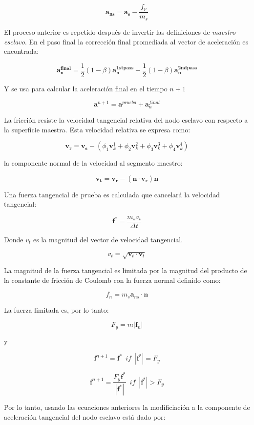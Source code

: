 $$
\mathbf{a_{ns}} = \mathbf{a_s} - \frac{f_p}{m_s}
$$

El proceso anterior es repetido después de invertir las definiciones de \textit{maestro-esclavo}. 
En el paso final la corrección final promediada al vector de aceleración es encontrada:

$$
\mathbf{a_n^{final}} = \frac{1}{2} (1-\beta) \mathbf{a_n^{1st pass}} + 
\frac{1}{2} (1-\beta) \mathbf{a_n^{2nd pass}} 
$$

Y se usa para calcular la aceleración final en el tiempo $n+1$

$$
\mathbf{a}^{n+1} = \mathbf{a}^{prueba} + \mathbf{a}_n^{final}
$$

La fricción resiste la velocidad tangencial relativa del nodo esclavo con respecto a 
la superficie maestra. Esta velocidad relativa se expresa como:

$$
\mathbf{v_r} = \mathbf{v_s} - 
\left(
\phi_1 \mathbf{v}_k^1 + \phi_2 \mathbf{v}_k^2 + \phi_3 \mathbf{v}_k^3 + \phi_4 \mathbf{v}_k^4
\right)
$$

la componente normal de la velocidad al segmento maestro:

$$
\mathbf{v_t} = \mathbf{v_r} - (\mathbf{n} \cdot \mathbf{v_r}) \mathbf{n}
$$

Una fuerza tangencial de prueba es calculada que cancelará la velocidad tangencial:

$$
\mathbf{f^{\ast}} = \frac{m_s v_t}{\Delta t}
$$

Donde $v_t$ es la magnitud del vector de velocidad tangencial.

$$
v_t = \sqrt{\mathbf{v}_t \cdot \mathbf{v}_t}
$$

La magnitud de la fuerza tangencial es limitada por la magnitud del producto de la constante de fricción 
de Coulomb con la fuerza normal definido como:

$$
f_n = m_s \mathbf{a}_{ns} \cdot \mathbf{n}
$$

La fuerza limitada es, por lo tanto:

$$
F_y = m |\mathbf{f}_n|
$$

y 

$$
\mathbf{f}^{n+1} = \mathbf{f^{\ast}} \,\,\, if \,\,\, |\mathbf{f^{\ast}}| = F_y
$$

$$
\mathbf{f}^{n+1} = \frac{F_y \mathbf{f^{\ast}}}{|\mathbf{f^{\ast}}|} \,\,\, if \,\,\, |\mathbf{f^{\ast}}| > F_y
$$

Por lo tanto, usando las ecuaciones anteriores la modificiación a la componente de  aceleración tangencial 
del nodo esclavo está dado por:

